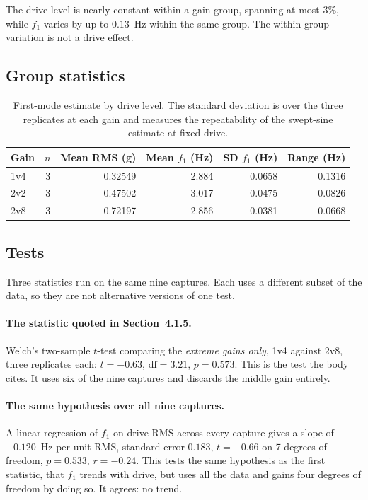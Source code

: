 The drive level is nearly constant within a gain group, spanning at most
$3\%$, while $f_1$ varies by up to $0.13$~Hz within the same group. The
within-group variation is not a drive effect.

\subsection*{Group statistics}

\begin{table}[htbp]
\centering
\caption{First-mode estimate by drive level. The standard deviation is over the
three replicates at each gain and measures the repeatability of the swept-sine
estimate at fixed drive.}
\label{tab:lin-groups}
\begin{tabular}{lrrrrr}
\toprule
Gain & $n$ & Mean RMS (g) & Mean $f_1$ (Hz) & SD $f_1$ (Hz) & Range (Hz) \\
\midrule
1v4 & 3 & 0.32549 & 2.884 & 0.0658 & 0.1316 \\
2v2 & 3 & 0.47502 & 3.017 & 0.0475 & 0.0826 \\
2v8 & 3 & 0.72197 & 2.856 & 0.0381 & 0.0668 \\
\bottomrule
\end{tabular}
\end{table}

\subsection*{Tests}

Three statistics run on the same nine captures. Each uses a different subset
of the data, so they are not alternative versions of one test.

\paragraph{The statistic quoted in Section~4.1.5.} Welch's two-sample $t$-test
comparing the \emph{extreme gains only}, 1v4 against 2v8, three replicates each:
$t = -0.63$, $\mathrm{df} = 3.21$, $p = 0.573$. This is the test the body cites.
It uses six of the nine captures and discards the middle gain entirely.

\paragraph{The same hypothesis over all nine captures.} A linear regression of $f_1$
on drive RMS across every capture gives a slope of $-0.120$~Hz per unit RMS,
standard error $0.183$, $t = -0.66$ on 7 degrees of freedom, $p = 0.533$,
$r = -0.24$. This tests the same hypothesis as the first statistic, that $f_1$
trends with drive, but uses all the data and gains four degrees of freedom by
doing so. It agrees: no trend.

